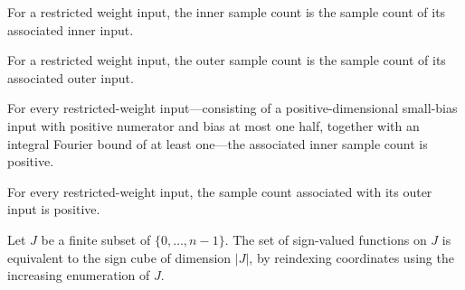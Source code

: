 \begin{definition}
\label{FABL.RestrictedWeightInput.innerCount}
\leanok
{}
For a restricted weight input, the inner sample count is the sample count of its
associated inner input.
\end{definition}

\begin{definition}
\label{FABL.RestrictedWeightInput.outerCount}
\leanok
{}
For a restricted weight input, the outer sample count is the sample count of its
associated outer input.
\end{definition}

\begin{theorem}
\label{FABL.RestrictedWeightInput.innerCount_pos}
\leanok
{}
For every restricted-weight input—consisting of a positive-dimensional small-bias input
with positive numerator and bias at most one half, together with an integral Fourier
bound of at least one—the associated inner sample count is positive.
\end{theorem}

\begin{theorem}
\label{FABL.RestrictedWeightInput.outerCount_pos}
\leanok
{}
For every restricted-weight input, the sample count associated with its outer input is
positive.
\end{theorem}

\begin{definition}
\label{FABL.freeSignCubeEquiv}
\leanok
{}
Let $J$ be a finite subset of $\{0,\ldots,n-1\}$. The set of sign-valued functions on
$J$ is equivalent to the sign cube of dimension $|J|$, by reindexing coordinates using
the increasing enumeration of $J$.
\end{definition}


